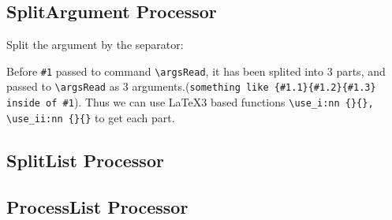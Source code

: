 \documentclass[oneside]{book}
\begin{document}
\subsection{SplitArgument Processor}
Split the argument by the separator:

Before \verb|#1| passed to command \verb|\argsRead|, it has been splited into 3 parts, and passed to 
\verb|\argsRead| as 3 arguments.(\verb|something like {#1.1}{#1.2}{#1.3} inside of #1|). Thus we can use 
\LaTeX3 based functions \verb|\use_i:nn {}{}, \use_ii:nn {}{}| to get each part.


\subsection{SplitList Processor}


\subsection{ProcessList Processor}
\begin{code}
\ExplSyntaxOn
\NewDocumentCommand{}
{ 
   { \addBrace } 
}
\NewDocumentCommand{}
\ExplSyntaxOff

\end{code}
\end{document}
